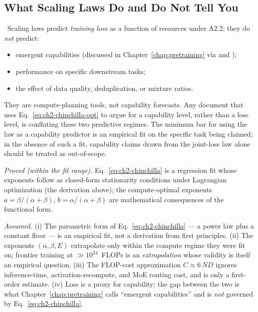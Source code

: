 \subsection{What Scaling Laws Do and Do Not Tell You}

\Norm\ Scaling laws predict \emph{training loss} as a function of
resources under A2.2; they do \emph{not} predict:
\begin{itemize}
  \item emergent capabilities (discussed in Chapter~\ref{chap:pretraining} via
        \citet{wei2022emergent} and \citet{schaeffer2023mirage});
  \item performance on specific downstream tasks;
  \item the effect of data quality, deduplication, or mixture ratios.
\end{itemize}
They are compute-planning tools, not capability forecasts. Any
document that uses Eq.~\eqref{eq:ch2-chinchilla-opt} to argue for a
capability level, rather than a loss level, is conflating these two
predictive regimes. The minimum bar for using the law as a capability
predictor is an empirical fit on the specific task being claimed; in
the absence of such a fit, capability claims drawn from the joint-loss
law alone should be treated as out-of-scope.

\begin{provedassumed}
\emph{Proved (within the fit range).}
Eq.~\eqref{eq:ch2-chinchilla} is a regression fit whose exponents
follow as closed-form stationarity conditions under Lagrangian
optimization (the derivation above); the compute-optimal exponents
$a = \beta/(\alpha+\beta)$, $b = \alpha/(\alpha+\beta)$ are
mathematical consequences of the functional form.

\emph{Assumed.}
(i) The parametric form of Eq.~\eqref{eq:ch2-chinchilla} — a power
law plus a constant floor — is an empirical fit, not a derivation
from first principles.
(ii) The exponents $(\alpha, \beta, E)$ extrapolate only within the
compute regime they were fit on; frontier training at
$\gg 10^{24}$~FLOPs is an \emph{extrapolation} whose validity is
itself an empirical question.
(iii) The FLOP-cost approximation $C \approx 6\,N D$ ignores
inference-time, activation-recompute, and MoE routing cost, and is
only a first-order estimate.
(iv) Loss is a proxy for capability; the gap between the two is
what Chapter~\ref{chap:pretraining} calls ``emergent capabilities'' and is \emph{not}
governed by Eq.~\eqref{eq:ch2-chinchilla}.
\end{provedassumed}

